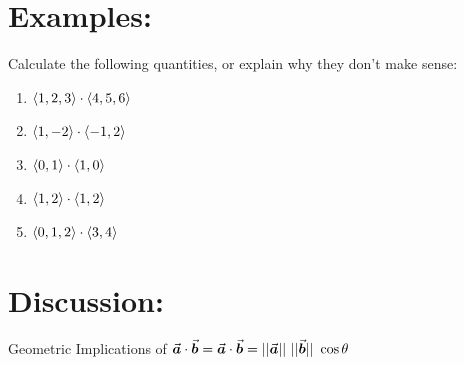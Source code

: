

\section*{Examples:}
Calculate the following quantities, or explain why they don't make sense:

\begin{enumerate}

\item \(\left\langle 1, 2, 3\right\rangle \cdot \left\langle4, 5, 6\right\rangle\)
\vspace*{.5in}

\item \(\left\langle 1,-2\right\rangle \cdot \left\langle-1, 2\right\rangle\)
\vspace*{.5in}

\item \(\left\langle 0,1\right\rangle \cdot \left\langle1,0\right\rangle\)
\vspace*{.5in}

\item \(\left\langle 1,2\right\rangle \cdot \left\langle1, 2\right\rangle\)
\vspace*{.5in}

\item \(\left\langle 0,1, 2\right\rangle \cdot \left\langle3, 4\right\rangle\)
\vspace*{.5in}

\end{enumerate}

\section*{Discussion:}
Geometric Implications of  \(\vec{a} \cdot \vec{b} =\vec{a} \cdot \vec{b} =| |\a||\  ||\b||\ \cos \theta\)



%



